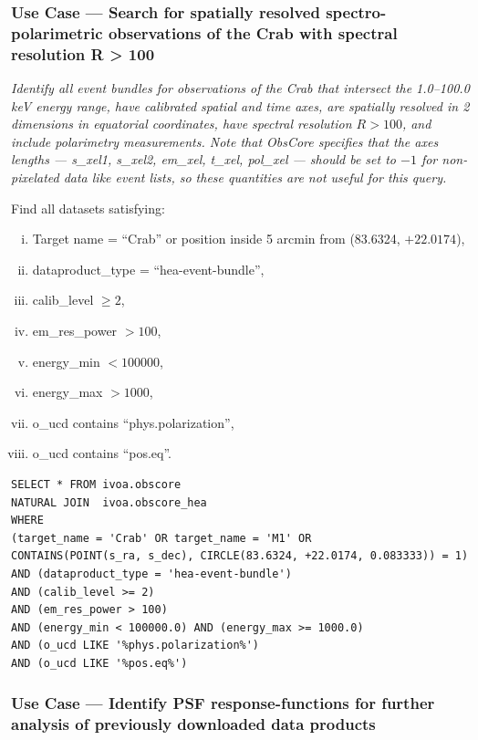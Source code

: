 \subsubsection{Use Case --- Search for spatially resolved spectro-polarimetric observations of the Crab with spectral resolution R > 100}

{\em Identify all event bundles for observations of the Crab that intersect the 1.0--100.0 keV energy range, have calibrated spatial and time axes, are spatially resolved in 2 dimensions in equatorial coordinates, have spectral resolution $R>100$, and include polarimetry measurements.  Note that ObsCore specifies that the axes lengths --- {\em s\_xel1, s\_xel2, em\_xel, t\_xel, pol\_xel} --- should be set to $-1$ for non-pixelated data like event lists, so these quantities are not useful for this query.\/}


\medskip
\noindent Find all datasets satisfying:
\begin{enumerate}[(i)]
  \item Target name = ``Crab'' or position inside 5 arcmin from (83.6324, $+22.0174$),
  \item dataproduct\_type = ``hea-event-bundle'',
  \item calib\_level $\geq 2$,
  \item em\_res\_power $> 100$,
  \item energy\_min $< 100000$,
  \item energy\_max $> 1000$,
  \item o\_ucd contains ``phys.polarization'',
  \item o\_ucd contains ``pos.eq''.
\end{enumerate}

\begin{verbatim}
SELECT * FROM ivoa.obscore
NATURAL JOIN  ivoa.obscore_hea
WHERE
(target_name = 'Crab' OR target_name = 'M1' OR
CONTAINS(POINT(s_ra, s_dec), CIRCLE(83.6324, +22.0174, 0.083333)) = 1)
AND (dataproduct_type = 'hea-event-bundle')
AND (calib_level >= 2)
AND (em_res_power > 100)
AND (energy_min < 100000.0) AND (energy_max >= 1000.0)
AND (o_ucd LIKE '%phys.polarization%')
AND (o_ucd LIKE '%pos.eq%')
\end{verbatim}


\subsubsection{Use Case --- Identify PSF response-functions for further analysis of previously downloaded data products}

